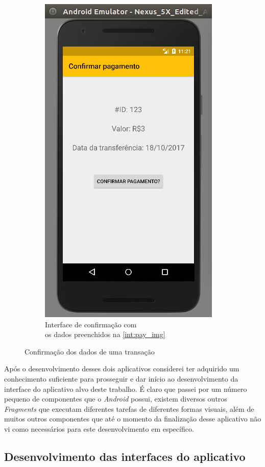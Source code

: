 \documentclass[hidelinks,12pt]{article}
\begin{document}
\begin{figure}[H]
\begin{subfigure}{0.5\textwidth}
		\includegraphics[scale=0.5]{int:confirm}
		\caption{Interface de confirma\c{c}\~ao com\\\hspace{\textwidth}os dados preenchidos na \ref{int:pay_img}}
		\label{int:confirm}
	\end{subfigure}
	\caption{Confirma\c{c}\~ao dos dados de uma transa\c{c}\~ao}
	\label{pay_composite}
\end{figure}

Ap\'os o desenvolvimento desses dois aplicativos considerei ter adquirido um conhecimento suficiente para prosseguir e dar início ao desenvolvimento da interface do aplicativo alvo deste trabalho. \'E claro que passei por um n\'umero pequeno de componentes que o \textit{Android} possui, existem diversos outros \textit{Fragments} que executam diferentes tarefas de diferentes formas visuais, além de muitos outros componentes que at\'e o momento da finaliza\c{c}\~ao desse aplicativo n\~ao vi como necess\'arios para este desenvolvimento em espec\'ifico.

\subsection{Desenvolvimento das interfaces do aplicativo}
\end{document}
